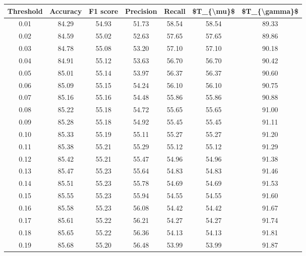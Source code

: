 \begin{tabular}{|c|c|c|c|c|c|c|}
\hline
 Threshold &  Accuracy &  F1 score &  Precision &  Recall &  \$T\_\{\textbackslash mu\}\$ &  \$T\_\{\textbackslash gamma\}\$ \\
\hline
      0.01 &     84.29 &     54.93 &      51.73 &   58.54 &      58.54 &         89.33 \\
      0.02 &     84.59 &     55.02 &      52.63 &   57.65 &      57.65 &         89.86 \\
      0.03 &     84.78 &     55.08 &      53.20 &   57.10 &      57.10 &         90.18 \\
      0.04 &     84.91 &     55.12 &      53.63 &   56.70 &      56.70 &         90.42 \\
      0.05 &     85.01 &     55.14 &      53.97 &   56.37 &      56.37 &         90.60 \\
      0.06 &     85.09 &     55.15 &      54.24 &   56.10 &      56.10 &         90.75 \\
      0.07 &     85.16 &     55.16 &      54.48 &   55.86 &      55.86 &         90.88 \\
      0.08 &     85.22 &     55.18 &      54.72 &   55.65 &      55.65 &         91.00 \\
      0.09 &     85.28 &     55.18 &      54.92 &   55.45 &      55.45 &         91.11 \\
      0.10 &     85.33 &     55.19 &      55.11 &   55.27 &      55.27 &         91.20 \\
      0.11 &     85.38 &     55.21 &      55.29 &   55.12 &      55.12 &         91.29 \\
      0.12 &     85.42 &     55.21 &      55.47 &   54.96 &      54.96 &         91.38 \\
      0.13 &     85.47 &     55.23 &      55.64 &   54.83 &      54.83 &         91.46 \\
      0.14 &     85.51 &     55.23 &      55.78 &   54.69 &      54.69 &         91.53 \\
      0.15 &     85.55 &     55.23 &      55.94 &   54.55 &      54.55 &         91.60 \\
      0.16 &     85.58 &     55.23 &      56.08 &   54.42 &      54.42 &         91.67 \\
      0.17 &     85.61 &     55.22 &      56.21 &   54.27 &      54.27 &         91.74 \\
      0.18 &     85.65 &     55.22 &      56.36 &   54.13 &      54.13 &         91.81 \\
      0.19 &     85.68 &     55.20 &      56.48 &   53.99 &      53.99 &         91.87 \\

\end{tabular}

